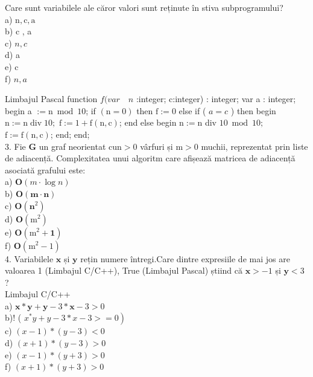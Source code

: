 Care sunt variabilele ale căror valori sunt reținute în stiva subprogramului?\\
a) $\mathrm{n}, \mathrm{c}, \mathrm{a}$\\
b) c , a\\
c) $n, c$\\
d) a\\
e) c\\
f) $n, a$

Limbajul Pascal function $f(v a r \quad n$ :integer; c:integer) : integer; var a : integer; begin a $:=\mathrm{n} \bmod 10$; if $(\mathrm{n}=0)$ then $\mathrm{f}:=0$ else if ( $a=c$ ) then begin $\mathrm{n}:=\mathrm{n} \operatorname{div} 10 ;$ $\mathrm{f}:=1+\mathrm{f}(\mathrm{n}, \mathrm{c})$; end else begin $\mathrm{n}:=\mathrm{n}$ div $10 \bmod 10 ;$ $\mathrm{f}:=\mathrm{f}(\mathrm{n}, \mathrm{c})$; end; end;\\
3. Fie $\mathbf{G}$ un graf neorientat $\mathrm{cu} \mathrm{n}>0$ vârfuri și $\mathrm{m}>0$ muchii, reprezentat prin liste de adiacență. Complexitatea unui algoritm care afișează matricea de adiacență asociată grafului este:\\
a) $\mathbf{O}(m \cdot \log n)$\\
b) $\mathbf{O}(\mathbf{m} \cdot \mathbf{n})$\\
c) $\mathbf{O}\left(\mathbf{n}^{2}\right)$\\
d) $\mathbf{O}\left(\mathrm{m}^{2}\right)$\\
e) $\mathbf{O}\left(\mathrm{m}^{2}+\mathbf{1}\right)$\\
f) $\mathbf{O}\left(\mathrm{m}^{2}-1\right)$\\
4. Variabilele $\mathbf{x}$ și $\mathbf{y}$ rețin numere întregi.Care dintre expresiile de mai jos are valoarea 1 (Limbajul C/C++), True (Limbajul Pascal) știind că $\mathbf{x}>-1$ și $\mathbf{y}<3$ ?\\
Limbajul C/C++\\
a) $\mathbf{x *} \mathbf{y}+\mathbf{y}-3 * \mathbf{x}-3>0$\\
b)! ( $\left.x^{*} y+y-3 * x-3>=0\right)$\\
c) $(x-1) *(y-3)<0$\\
d) $(x+1) *(y-3)>0$\\
e) $(x-1) *(y+3)>0$\\
f) $(x+1) *(y+3)>0$

